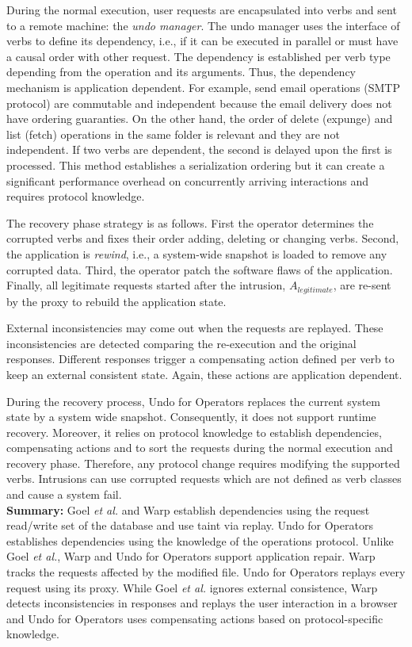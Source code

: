 During the normal execution, user requests are encapsulated into verbs and sent to a remote machine: the \emph{undo manager}. The undo manager uses the interface of verbs to define its dependency, i.e., if it can be executed in parallel or must have a causal order with other request. The dependency is established per verb type depending from the operation and its arguments. Thus, the dependency mechanism is application dependent. For example, send email operations (SMTP protocol) are commutable and independent because the email delivery does not have ordering guaranties. On the other hand, the order of delete (expunge) and list (fetch) operations in the same folder is relevant and they are not independent. If two verbs are dependent, the second is delayed upon the first is processed. This method establishes a serialization ordering but it can create a significant performance overhead on concurrently arriving interactions and requires protocol knowledge.

The recovery phase strategy is as follows. First the operator determines the corrupted verbs and fixes their order adding, deleting or changing verbs. Second, the application is \textit{rewind}, i.e., a system-wide snapshot is loaded to remove any corrupted data. Third, the operator patch the software flaws of the application. Finally, all legitimate requests started after the intrusion, $A_{legitimate}$, are re-sent by the proxy to rebuild the application state. 

External inconsistencies may come out when the requests are replayed. These inconsistencies are detected comparing the re-execution and the original responses. Different responses trigger a compensating action defined per verb to keep an external consistent state. Again, these actions are application dependent.

During the recovery process, Undo for Operators replaces the current system state by a system wide snapshot. Consequently, it does not support runtime recovery. Moreover, it relies on protocol knowledge to establish dependencies, compensating actions and to sort the requests during the normal execution and recovery phase. Therefore, any protocol change requires modifying the supported verbs. Intrusions can use corrupted requests which are not defined as verb classes and cause a system fail.\\


\textbf{Summary:} Goel \textit{et al.} and Warp \cite{warp} establish dependencies using the request read/write set of the database and use taint via replay. Undo for Operators \cite{undoForOperators} establishes dependencies using the knowledge of the operations protocol. Unlike Goel \textit{et al.}, Warp \cite{warp} and Undo for Operators \cite{undoForOperators} support application repair. Warp tracks the requests affected by the modified file. Undo for Operators replays every request using its proxy. While Goel \textit{et al.} ignores external consistence, Warp \cite{warp} detects inconsistencies in responses and replays the user interaction in a browser and Undo for Operators uses compensating actions based on protocol-specific knowledge.

